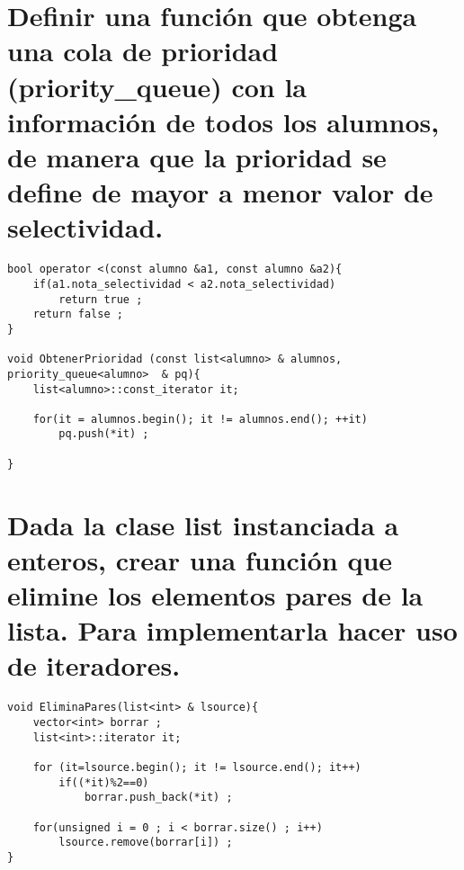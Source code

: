 \section{
	Definir una función que obtenga una cola de prioridad (priority\_queue) con la información de todos los
	alumnos, de manera que la prioridad se define de mayor a menor valor de selectividad.
}

\begin{lstlisting}[style=cmas]
bool operator <(const alumno &a1, const alumno &a2){
	if(a1.nota_selectividad < a2.nota_selectividad)
		return true ;
	return false ;
}

void ObtenerPrioridad (const list<alumno> & alumnos, priority_queue<alumno>  & pq){
	list<alumno>::const_iterator it;
	
	for(it = alumnos.begin(); it != alumnos.end(); ++it)
		pq.push(*it) ;
	
}		
\end{lstlisting}

\section{ Dada la clase list instanciada a enteros, crear una función que elimine los elementos pares de la
	lista. Para implementarla hacer uso de iteradores.
}

\begin{lstlisting}[style=cmas]
void EliminaPares(list<int> & lsource){
	vector<int> borrar ;
	list<int>::iterator it;
	
	for (it=lsource.begin(); it != lsource.end(); it++)
		if((*it)%2==0)
			borrar.push_back(*it) ;
	
	for(unsigned i = 0 ; i < borrar.size() ; i++)
		lsource.remove(borrar[i]) ;
}	
\end{lstlisting}

